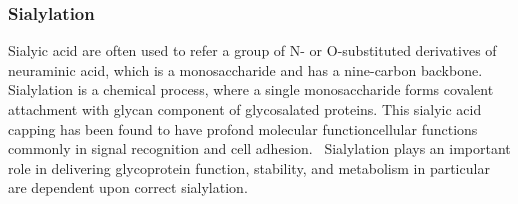 \subsubsection {Sialylation}
Sialyic acid are often used to refer a group of N- or O-substituted derivatives of neuraminic acid, which is a monosaccharide and has a nine-carbon backbone.~\cite{Vocadlo_2009} Sialylation is a chemical process, where a single monosaccharide forms covalent attachment with glycan component of glycosalated proteins. This sialyic acid capping has been found to have profond molecular functioncellular functions commonly in signal recognition and cell adhesion.~\cite{Bhide_2016} Sialylation plays an important role in delivering glycoprotein function, stability, and metabolism in particular are dependent upon correct sialylation.